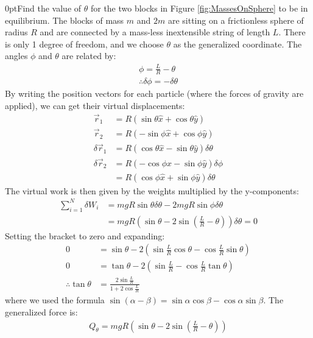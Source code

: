\begin{example}{0pt}{Find the value of $\theta$ for the two blocks in Figure \ref{fig:MassesOnSphere} to be in equilibrium. The blocks of mass $m$ and $2m$ are sitting on a frictionless sphere of radius $R$ and are connected by a mass-less inextensible string of length $L$.}{}
There is only 1 degree of freedom, and we choose $\theta$ as the generalized coordinate. The angles $\phi$ and $\theta$ are related by:
\begin{align*}
\phi=\frac{L}{R}-\theta\\
\therefore \delta\phi = -\delta \theta
\end{align*}
By writing the position vectors for each particle (where the forces of gravity are applied), we can get their virtual displacements:
\begin{align*}
\vec{r}_1&=R(\sin{\theta}\hat{x}+\cos{\theta}\hat{y})\\
\vec{r}_2&=R(-\sin{\phi}\hat{x}+\cos{\phi}\hat{y})\\
\delta\vec{r}_1&=R(\cos{\theta}\hat{x}-\sin{\theta}\hat{y})\delta\theta\\
\delta\vec{r}_2&=R(-\cos{\phi}\hat{x}-\sin{\phi}\hat{y})\delta\phi\\
&=R(\cos{\phi}\hat{x}+\sin{\phi}\hat{y})\delta\theta
\end{align*}
The virtual work is then given by the weights multiplied by the y-components:
\begin{align*}
\sum_{i=1}^N\delta W_i&=mgR\sin{\theta}\delta\theta-2mgR\sin{\phi}\delta\theta\\
&=mgR\left(\sin{\theta}-2\sin\left(\frac{L}{R}-\theta\right)\right)\delta\theta=0
\end{align*}
Setting the bracket to zero and expanding:
\begin{align*}
0&=\sin{\theta}-2\left(\sin{\frac{L}{R}}\cos{\theta}-\cos{\frac{L}{R}}\sin{\theta}\right)\\
0&=\tan{\theta}-2\left(\sin{\frac{L}{R}}-\cos{\frac{L}{R}}\tan{\theta}\right)\\
\therefore\tan{\theta}&=\frac{2\sin{\frac{L}{R}}}{1+2\cos{\frac{L}{R}}}
\end{align*}
where we used the formula $\sin{(\alpha-\beta)}=\sin\alpha\cos\beta -\cos\alpha\sin\beta$. The generalized force is:
\begin{align*}
Q_\theta=mgR\left(\sin{\theta}-2\sin\left(\frac{L}{R}-\theta\right)\right)
\end{align*}
\end{example}

